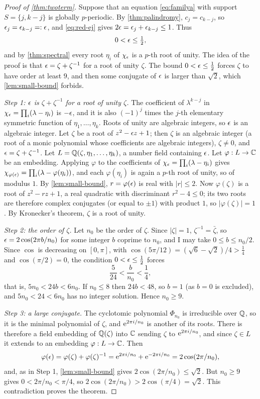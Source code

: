 \begin{proof}[Proof of \autoref{thm:twoterm}]
Suppose that an equation \eqref{eq:familya} with support $S=\{j,k-j\}$ is
globally $p$-periodic. By \autoref{thm:palindromy}, $c_j=c_{k-j}$, so
$\epsilon_j=\epsilon_{k-j}=:\epsilon$, and \eqref{eq:red-ej} gives
$2\epsilon=\epsilon_j+\epsilon_{k-j}\le1$. Thus
\[
0<\epsilon\le\tfrac12,
\]
and by \autoref{thm:spectral} every root $\eta_i$ of $\chi_\epsilon$ is a
$p$-th root of unity. The idea of the proof is that $\epsilon=\zeta+\zeta^{-1}$
for a root of unity $\zeta$. The bound $0<\epsilon\le\tfrac12$ forces $\zeta$ to
have order at least $9$, and then some conjugate of $\epsilon$ is larger than
$\sqrt2$, which \autoref{lem:small-bound} forbids.

\emph{Step 1: $\epsilon$ is $\zeta+\zeta^{-1}$ for a root of unity $\zeta$.}
The coefficient of $\lambda^{k-j}$ in
$\chi_\epsilon=\prod_i(\lambda-\eta_i)$ is $-\epsilon$, and it is also $(-1)^j$
times the $j$-th elementary symmetric function of $\eta_1,\dots,\eta_k$.
Roots of unity are algebraic integers, so $\epsilon$ is an algebraic integer. Let $\zeta$ be a
root of $z^2-\epsilon z+1$; then $\zeta$ is an algebraic integer (a root of a
monic polynomial whose coefficients are algebraic integers), $\zeta\ne0$,
and $\epsilon=\zeta+\zeta^{-1}$. Let $L=\mathbb{Q}(\zeta,\eta_1,\dots,\eta_k)$,
a number field containing $\epsilon$. Let $\varphi:L\to\mathbb{C}$ be an embedding.
Applying $\varphi$ to the coefficients of
$\chi_\epsilon=\prod_i(\lambda-\eta_i)$ gives
$\chi_{\varphi(\epsilon)}=\prod_i(\lambda-\varphi(\eta_i))$, and each
$\varphi(\eta_i)$ is again a $p$-th root of unity, so of modulus $1$. By
\autoref{lem:small-bound}, $r=\varphi(\epsilon)$ is real with $|r|\le2$. Now
$\varphi(\zeta)$ is a root of $z^2-rz+1$, a real quadratic with
discriminant $r^2-4\le0$; its two roots are therefore complex conjugates
(or equal to $\pm1$) with product $1$, so $|\varphi(\zeta)|=1$. By
Kronecker's theorem, $\zeta$ is a root of unity.

\emph{Step 2: the order of $\zeta$.} Let $n_0$ be the order of $\zeta$.
Since $|\zeta|=1$, $\zeta^{-1}=\bar\zeta$, so
$\epsilon=2\cos(2\pi b/n_0)$ for some integer $b$ coprime to $n_0$, and I may
take $0\le b\le n_0/2$. Since $\cos$ is decreasing on $[0,\pi]$, with
$\cos(5\pi/12)=(\sqrt6-\sqrt2)/4>\tfrac14$ and $\cos(\pi/2)=0$, the
condition $0<\epsilon\le\tfrac12$ forces
\[
\frac5{24}<\frac b{n_0}<\frac14,
\]
that is, $5n_0<24b<6n_0$. If $n_0\le8$ then $24b<48$, so $b=1$ (as $b=0$ is
excluded), and $5n_0<24<6n_0$ has no integer solution. Hence $n_0\ge9$.

\emph{Step 3: a large conjugate.} The cyclotomic polynomial
$\Phi_{n_0}$ is irreducible over $\mathbb{Q}$, so it is the minimal polynomial of
$\zeta$, and $\mathrm{e}^{2\pi i/n_0}$ is another of its roots. There is therefore a
field embedding of $\mathbb{Q}(\zeta)$ into $\mathbb{C}$ sending $\zeta$ to $\mathrm{e}^{2\pi i/n_0}$,
and since $\zeta\in L$ it extends to an embedding $\varphi:L\to\mathbb{C}$. Then
\[
\varphi(\epsilon)=\varphi(\zeta)+\varphi(\zeta)^{-1}
=\mathrm{e}^{2\pi i/n_0}+\mathrm{e}^{-2\pi i/n_0}=2\cos(2\pi/n_0),
\]
and, as in Step 1, \autoref{lem:small-bound} gives
$2\cos(2\pi/n_0)\le\sqrt2$. But $n_0\ge9$ gives $0<2\pi/n_0<\pi/4$, so
$2\cos(2\pi/n_0)>2\cos(\pi/4)=\sqrt2$. This contradiction proves the
theorem.
\end{proof}
